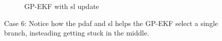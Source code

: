 \begin{figure}
    \begin{subfigure}{\textwidth}
        \caption{GP-EKF with \acrshort{sl} update}
    \end{subfigure}
    \caption{Case 6: Notice how the \acrshort{pdaf} and \acrshort{sl} helps the GP-EKF select a single branch, insteading getting stuck in the middle.}
    \label{fig:app_branching_gp_ekf_update}
\end{figure}

